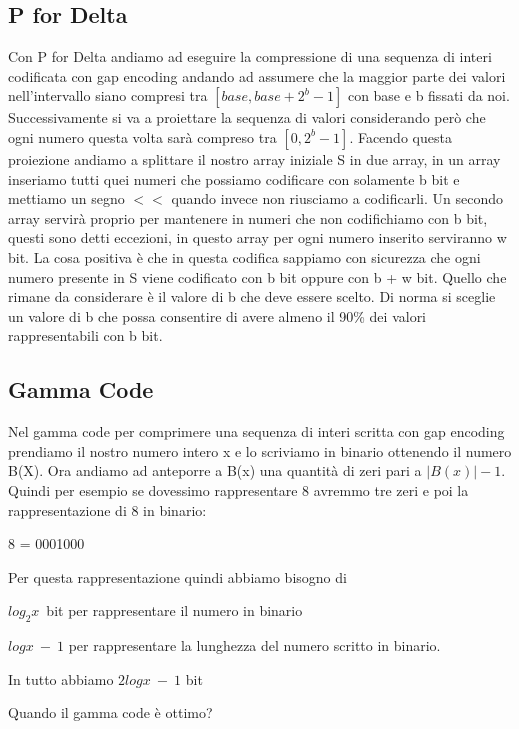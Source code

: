 \documentclass[14pt]{extreport}
\begin{document}
\subsection{P for Delta}

Con P for Delta andiamo ad eseguire la compressione di una sequenza di interi codificata con gap encoding andando ad assumere che la maggior parte dei valori nell'intervallo siano compresi tra $[base, base + 2^b -1]$ con base e b fissati da noi.
Successivamente si va a proiettare la sequenza di valori considerando però che ogni numero questa volta sarà compreso tra $[0, 2^b -1]$.
Facendo questa proiezione andiamo a splittare il nostro array iniziale S in due array, in un array inseriamo tutti quei numeri che possiamo codificare con solamente b bit e mettiamo un segno $<<$ quando invece non riusciamo a codificarli. Un secondo array servirà proprio per mantenere in numeri che non codifichiamo con b bit, questi sono detti eccezioni, in questo array per ogni numero inserito serviranno w bit.
La cosa positiva è che in questa codifica sappiamo con sicurezza che ogni numero presente in S viene codificato con b bit oppure con b + w bit.
Quello che rimane da considerare è il valore di b che deve essere scelto. Di norma si sceglie un valore di b che possa consentire di avere almeno il 90\% dei valori rappresentabili con b bit.

\subsection{Gamma Code}

Nel gamma code per comprimere una sequenza di interi scritta con gap encoding prendiamo il nostro numero intero x e lo scriviamo in binario ottenendo il numero B(X). Ora andiamo ad anteporre a B(x) una quantità di zeri pari a $|B(x)| - 1$. Quindi per esempio se dovessimo rappresentare 8 avremmo tre zeri e poi la rappresentazione di 8 in binario:
\newline
\centerline{8 = 0001000}

Per questa rappresentazione quindi abbiamo bisogno di \newline
\centerline{$log_2 x$\ bit per rappresentare il numero in binario}
\newline
\centerline{$log x \ -\ 1$ per rappresentare la lunghezza del numero scritto in binario.}
\newline
\centerline{In tutto abbiamo $2log x\ -\ 1$ bit}

Quando il gamma code è ottimo?\newline
\end{document}

